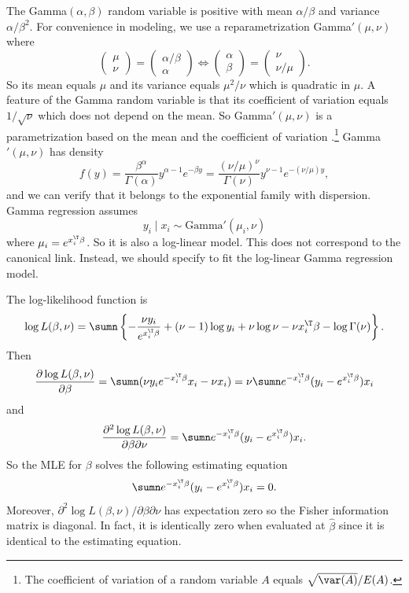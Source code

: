 The Gamma$(\alpha, \beta)$ random variable is positive with mean $\alpha/\beta$ and variance $\alpha/\beta^2$. For convenience in modeling, we use a reparametrization Gamma$'(\mu, \nu)$ where  
$$
\begin{pmatrix}
\mu \\
\nu
\end{pmatrix}
= \begin{pmatrix}
\alpha/\beta \\
\alpha 
\end{pmatrix}
\Longleftrightarrow
\begin{pmatrix}
\alpha \\
\beta
\end{pmatrix}
= \begin{pmatrix}
\nu\\
\nu / \mu 
\end{pmatrix}.
$$
So its mean equals $\mu$ and its variance equals $\mu^2 / \nu$ which is quadratic in $\mu$. A feature of the Gamma random variable is that its coefficient of variation equals $1 /  \sqrt{\nu}$ which does not depend on the mean. So  Gamma$'(\mu, \nu)$ is a parametrization based on the mean and the coefficient of variation \citep{mccullagh1989generalized}.\footnote{The coefficient of variation of a random variable $A$ equals  $\sqrt{\var(A)} / E(A)$. } 
Gamma$'(\mu, \nu)$ has density
$$
f(y)  =  \frac{\beta^\alpha }{ \Gamma (\alpha) } y^{\alpha - 1} e^{- \beta y} 
=  \frac{ (\nu / \mu )^\nu }{ \Gamma (\nu) } y^{\nu - 1} e^{- (\nu / \mu ) y} ,
$$ 
and we can verify that it belongs to the exponential family with dispersion. 
Gamma regression assumes
$$
y_i \mid x_i \sim \text{Gamma}' (\mu_i, \nu)
$$
where $\mu_i = e^{x_i^{\T} \beta}$. So it is also a log-linear model. This does not correspond to the canonical link. Instead, we should specify  to fit the log-linear Gamma regression model. 

The log-likelihood function is
$$
\log L(\beta, \nu) = 
\sumn \left\{ 
- \frac{  \nu y_i }{  e^{x_i^{\T} \beta} }  + (\nu - 1)\log y_i + \nu \log \nu - \nu x_i^{\T} \beta - \log\Gamma(\nu)
\right\} .
$$
Then
$$
\frac{ \partial  \log L(\beta, \nu) }{\partial \beta } = 
\sumn ( \nu y_i e^{ - x_i^{\T} \beta}  x_i  - \nu x_i ) = 
\nu \sumn e^{ - x_i^{\T} \beta}  (y_i -  e^{x_i^{\T} \beta}) x_i  
$$
and
$$
\frac{ \partial^2  \log L(\beta, \nu) }{\partial \beta \partial \nu } =
 \sumn e^{ - x_i^{\T} \beta}  (y_i -  e^{x_i^{\T} \beta}) x_i  .
$$
So the MLE for $\beta$ solves the following estimating equation
$$
\sumn e^{ - x_i^{\T} \beta}  (y_i -  e^{x_i^{\T} \beta}) x_i   = 0.
$$
Moreover,  $ \partial^2  \log L(\beta, \nu)  / \partial \beta \partial \nu  $ has expectation zero
so the Fisher information matrix is diagonal. In fact, it is identically zero when evaluated at $\hat\beta$ since it is identical to the estimating equation. 

